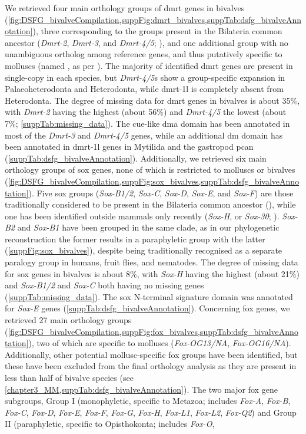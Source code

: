 We retrieved four main orthology groups of \gls{dmrt} genes in bivalves (\cref{fig:DSFG_bivalveCompilation,suppFig:dmrt_bivalves,suppTab:dsfg_bivalveAnnotation}), three corresponding to the groups present in the Bilateria common ancestor (\textit{Dmrt-2}, \textit{Dmrt-3}, and \textit{Dmrt-4/5}; ), and one additional group with no unambiguous ortholog among reference genes, and thus putatively specific to molluscs (named , as per ). The majority of identified \gls{dmrt} genes are present in single-copy in each species, but \textit{Dmrt-4/5}s show a group-specific expansion in Palaeoheterodonta and Heterodonta, while \gls{dmrt-1l} is completely absent from Heterodonta. The degree of missing data for \gls{dmrt} genes in bivalves is about 35\%, with \textit{Dmrt-2} having the highest (about 56\%) and \textit{Dmrt-4/5} the lowest (about 7\%; \cref{suppTab:missing_data}). The \gls{cue}-like \gls{dma} domain has been annotated in most of the \textit{Dmrt-3} and \textit{Dmrt-4/5} genes, while an additional \gls{dm} domain has been annotated in \gls{dmrt-1l} genes in Mytilida and the gastropod \gls{pcan} (\cref{suppTab:dsfg_bivalveAnnotation}). Additionally, we retrieved six main orthology groups of \gls{sox} genes, none of which is restricted to molluscs or bivalves (\cref{fig:DSFG_bivalveCompilation,suppFig:sox_bivalves,suppTab:dsfg_bivalveAnnotation}). Five \gls{sox} groups (\textit{Sox-B1/2}, \textit{Sox-C}, \textit{Sox-D}, \textit{Sox-E}, and \textit{Sox-F}) are those traditionally considered to be present in the Bilateria common ancestor (), while one has been identified outside mammals only recently (\textit{Sox-H}, or \textit{Sox-30}; ). \textit{Sox-B2} and \textit{Sox-B1} have been grouped in the same clade, as in our phylogenetic reconstruction the former results in a paraphyletic group with the latter (\cref{suppFig:sox_bivalves}), despite being traditionally recognised as a separate paralogy group in humans, fruit flies, and nematodes. The degree of missing data for \gls{sox} genes in bivalves is about 8\%, with \textit{Sox-H} having the highest (about 21\%) and \textit{Sox-B1/2} and \textit{Sox-C} both having no missing genes (\cref{suppTab:missing_data}). The \gls{sox} N-terminal signature domain was annotated for \textit{Sox-E} genes (\cref{suppTab:dsfg_bivalveAnnotation}). Concerning \gls{fox} genes, we retrieved 27 main orthology groups (\cref{fig:DSFG_bivalveCompilation,suppFig:fox_bivalves,suppTab:dsfg_bivalveAnnotation}), two of which are specific to molluscs (\textit{Fox-OG13/NA}, \textit{Fox-OG16/NA}). Additionally, other potential mollusc-specific \gls{fox} groups have been identified, but these have been excluded from the final orthology analysis as they are present in less than half of bivalve species (see \cref{chapter3_MM,suppTab:dsfg_bivalveAnnotation}). The two major \gls{fox} gene subgroups, Group I (monophyletic, specific to Metazoa; includes \textit{Fox-A}, \textit{Fox-B}, \textit{Fox-C}, \textit{Fox-D}, \textit{Fox-E}, \textit{Fox-F}, \textit{Fox-G}, \textit{Fox-H}, \textit{Fox-L1}, \textit{Fox-L2}, \textit{Fox-Q2}) and Group II (paraphyletic, specific to Opisthokonta; includes \textit{Fox-O}, 